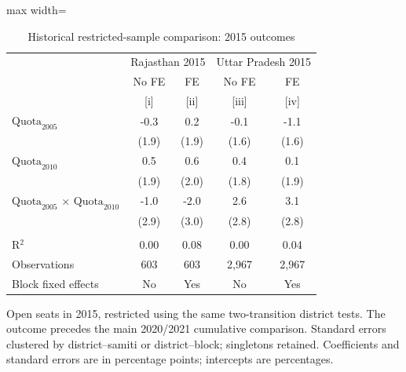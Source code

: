 
\begin{table}[htbp]
   \centering
   \scriptsize
   \begin{adjustbox}{max width=\linewidth}
      \begin{threeparttable}[b]
         \caption{\label{tab:long_term_restricted_2015} Historical restricted-sample comparison: 2015 outcomes}
         \bigskip
         \begin{tabular}{lcccc}
            \toprule
             & \multicolumn{2}{c}{Rajasthan 2015} & \multicolumn{2}{c}{Uttar Pradesh 2015} \\
                                                                    & No FE & FE    & No FE & FE \\
                                                                    & [i]   & [ii]  & [iii] & [iv]\\
            \midrule
            $\text{Quota}_{2005}$                                   & -0.3  & 0.2   & -0.1  & -1.1\\
                                                                    & (1.9) & (1.9) & (1.6) & (1.6)\\
            $\text{Quota}_{2010}$                                   & 0.5   & 0.6   & 0.4   & 0.1\\
                                                                    & (1.9) & (2.0) & (1.8) & (1.9)\\
            $\text{Quota}_{2005}$ $\times$ $\text{Quota}_{2010}$    & -1.0  & -2.0  & 2.6   & 3.1\\
                                                                    & (2.9) & (3.0) & (2.8) & (2.8)\\
             \\
            R$^2$                                                   & 0.00  & 0.08  & 0.00  & 0.04\\
            Observations                                            & 603   & 603   & 2,967 & 2,967\\
            Block fixed effects                                     & No    & Yes   & No    & Yes\\
            \bottomrule
         \end{tabular}

         \begin{tablenotes}
            \item Open seats in 2015, restricted using the same two-transition district tests. The outcome precedes the main 2020/2021 cumulative comparison. Standard errors clustered by district--samiti or district--block; singletons retained. Coefficients and standard errors are in percentage points; intercepts are percentages.
         \end{tablenotes}
      \end{threeparttable}
   \end{adjustbox}
\end{table}


